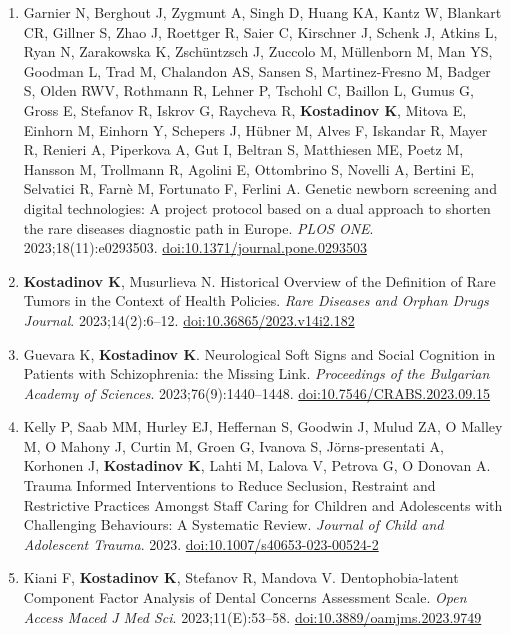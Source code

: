 \documentclass[
  10.5pt,
  a4paper,
  DIV=11,
  numbers=noendperiod]{scrartcl}
\begin{document}
\begin{enumerate}
\item
  Garnier N, Berghout J, Zygmunt A, Singh D, Huang KA, Kantz W, Blankart
  CR, Gillner S, Zhao J, Roettger R, Saier C, Kirschner J, Schenk J,
  Atkins L, Ryan N, Zarakowska K, Zschüntzsch J, Zuccolo M, Müllenborn
  M, Man YS, Goodman L, Trad M, Chalandon AS, Sansen S, Martinez-Fresno
  M, Badger S, Olden RWV, Rothmann R, Lehner P, Tschohl C, Baillon L,
  Gumus G, Gross E, Stefanov R, Iskrov G, Raycheva R, \textbf{Kostadinov
  K}, Mitova E, Einhorn M, Einhorn Y, Schepers J, Hübner M, Alves F,
  Iskandar R, Mayer R, Renieri A, Piperkova A, Gut I, Beltran S,
  Matthiesen ME, Poetz M, Hansson M, Trollmann R, Agolini E, Ottombrino
  S, Novelli A, Bertini E, Selvatici R, Farnè M, Fortunato F, Ferlini A.
  Genetic newborn screening and digital technologies: A project protocol
  based on a dual approach to shorten the rare diseases diagnostic path
  in Europe. \emph{PLOS ONE}. 2023;18(11):e0293503.
  \href{https://doi.org/10.1371/journal.pone.0293503}{doi:10.1371/journal.pone.0293503}
\item
  \textbf{Kostadinov K}, Musurlieva N. Historical Overview of the
  Definition of Rare Tumors in the Context of Health Policies.
  \emph{Rare Diseases and Orphan Drugs Journal}. 2023;14(2):6--12.
  \href{https://doi.org/10.36865/2023.v14i2.182}{doi:10.36865/2023.v14i2.182}
\item
  Guevara K, \textbf{Kostadinov K}. Neurological Soft Signs and Social
  Cognition in Patients with Schizophrenia: the Missing Link.
  \emph{Proceedings of the Bulgarian Academy of Sciences}.
  2023;76(9):1440--1448.
  \href{https://doi.org/10.7546/CRABS.2023.09.15}{doi:10.7546/CRABS.2023.09.15}
\item
  Kelly P, Saab MM, Hurley EJ, Heffernan S, Goodwin J, Mulud ZA, O
  Malley M, O Mahony J, Curtin M, Groen G, Ivanova S, Jörns-presentati
  A, Korhonen J, \textbf{Kostadinov K}, Lahti M, Lalova V, Petrova G, O
  Donovan A. Trauma Informed Interventions to Reduce Seclusion,
  Restraint and Restrictive Practices Amongst Staff Caring for Children
  and Adolescents with Challenging Behaviours: A Systematic Review.
  \emph{Journal of Child and Adolescent Trauma}. 2023.
  \href{https://doi.org/10.1007/s40653-023-00524-2}{doi:10.1007/s40653-023-00524-2}
\item
  Kiani F, \textbf{Kostadinov K}, Stefanov R, Mandova V.
  Dentophobia-latent Component Factor Analysis of Dental Concerns
  Assessment Scale. \emph{Open Access Maced J Med Sci}.
  2023;11(E):53--58.
  \href{https://doi.org/10.3889/oamjms.2023.9749}{doi:10.3889/oamjms.2023.9749}

\end{enumerate}
\end{document}
